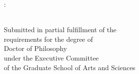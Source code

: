 %

\begin{titlepage}
	\tgherosfont
	\centering

	\vspace*{1.86in}

	{\large \thesisTitle}: {\large \thesisSubtitle} \\[0.55in]
	{\large \thesisName} \\

	\vfill
	\begin{minipage}[t]{.65\textwidth}
	  \begin{center}
		Submitted in partial fulfillment of the \\
		requirements for the degree of \\
		Doctor of Philosophy \\
		under the Executive Committee \\
		of the Graduate School of Arts and Sciences \\
		\vspace{0.75in}
		{\uppercase \thesisUniversity} \\
		\vspace{0.3in}
		\thesisYear \\
	  \end{center}
	\end{minipage} \\[5mm]



\end{titlepage}


